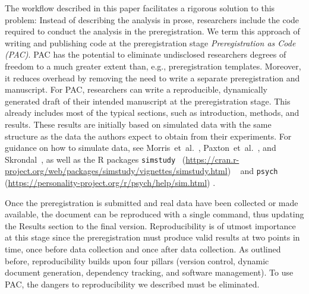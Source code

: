\documentclass[psych,tutorial,accept,moreauthors,pdftex]{Definitions/mdpi}
\begin{document}
\begin{paracol}{2}
The workflow described in this paper facilitates a rigorous solution to
this problem: Instead of describing the analysis in prose, researchers
include the code required to conduct the analysis in the
preregistration. We term this approach of writing and publishing code at
the preregistration stage \emph{Preregistration as Code (PAC)}. PAC has
the potential to eliminate undisclosed researchers degrees of freedom to
a much greater extent than, e.g., preregistration templates. Moreover,
it reduces overhead by removing the need to write a separate
preregistration and manuscript. For PAC, researchers can write a
reproducible, dynamically generated draft of their intended manuscript
at the preregistration stage. This already includes most of the typical
sections, such as introduction, methods, and results. These results are
initially based on simulated data with the same structure as the data
the authors expect to obtain from their experiments. For guidance on how
to simulate data, see Morris~et~al.~\citep{morrisUsingSimulationStudies2019},
Paxton~et~al.~\citep{paxtonMonteCarloExperiments2001}, and
Skrondal~\citep{skrondalDesignAnalysisMonte2000}, as well as the R packages
{\texttt{simstudy}} 
\mbox{ (\url{https://cran.r-project.org/web/packages/simstudy/vignettes/simstudy.html})}
~\citep{simstudy} and
{\texttt{psych}} (\url{https://personality-project.org/r/psych/help/sim.html})
\citep{psych}.

Once the preregistration is submitted and real data have been collected
or made available, the document can be reproduced with a single command,
thus updating the Results section to the final version. Reproducibility
is of utmost importance at this stage since the preregistration must
produce valid results at two points in time, once before data collection
and once after data collection. As outlined before, reproducibility
builds upon four pillars (version control, dynamic document generation,
dependency tracking, and software management). To use PAC, the dangers to
reproducibility we described must be eliminated.



\end{paracol}
\end{document}

